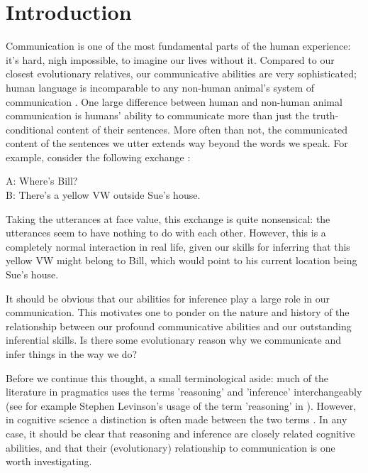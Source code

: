 \chapter*{Introduction}
\label{ch:introduction}

Communication is one of the most fundamental parts of the human experience: it's hard, nigh impossible, to imagine our lives without it. Compared to our closest evolutionary relatives, our communicative abilities are very sophisticated; human language is incomparable to any non-human animal's system of communication \citep{CheneySeyfarth98}.
One large difference between human and non-human animal communication is humans' ability to communicate more than just the truth-conditional content of their sentences. More often than not, the communicated content of the sentences we utter extends way beyond the words we speak. For example, consider the following exchange \citep[taken from][p.~102]{Levinson83}:
\begin{quoting}
    A: Where's Bill? \\
    B: There's a yellow VW outside Sue's house.
\end{quoting}
Taking the utterances at face value, this exchange is quite nonsensical: the utterances seem to have nothing to do with each other. However, this is a completely normal interaction in real life, given our skills for inferring that this yellow VW might belong to Bill, which would point to his current location being Sue's house.

It should be obvious that our abilities for inference play a large role in our communication. This motivates one to ponder on the nature and history of the relationship between our profound communicative abilities and our outstanding inferential skills. Is there some evolutionary reason why we communicate and infer things in the way we do?


Before we continue this thought, a small terminological aside: much of the literature in pragmatics uses the terms 'reasoning' and 'inference' interchangeably (see for example Stephen Levinson's usage of the term 'reasoning' in \citealp[p.~218]{Levinson83}). However, in cognitive science a distinction is often made between the two terms \citep[see][first paragraph]{MS11}.
In any case, it should be clear that reasoning and inference are closely related cognitive abilities, and that their (evolutionary) relationship to communication is one worth investigating.

